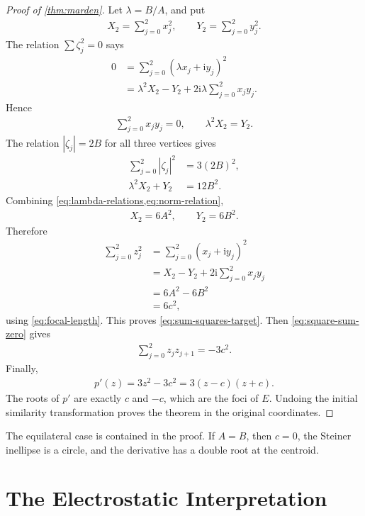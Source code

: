 \documentclass[11pt]{article}
\newcommand{\ii}{\mathrm{i}}
\begin{document}
\begin{proof}[Proof of \cref{thm:marden}]
Let \(\lambda=B/A\), and put
\begin{align}
  X_2=\sum_{j=0}^{2}x_j^2,\qquad
  Y_2=\sum_{j=0}^{2}y_j^2.
\end{align}
The relation \(\sum \zeta_j^2=0\) says
\begin{align}
  0
    &=\sum_{j=0}^{2}\left(\lambda x_j+\ii y_j\right)^2\\
    &=\lambda^2X_2-Y_2
      +2\ii\lambda\sum_{j=0}^{2}x_jy_j.
\end{align}
Hence
\begin{align}
  \sum_{j=0}^{2}x_jy_j=0,
  \qquad
  \lambda^2X_2=Y_2.
  \label{eq:lambda-relations}
\end{align}
The relation \(|\zeta_j|=2B\) for all three vertices gives
\begin{align}
  \sum_{j=0}^{2}|\zeta_j|^2
    &=3(2B)^2,\\
  \lambda^2X_2+Y_2
    &=12B^2.
  \label{eq:norm-relation}
\end{align}
Combining \cref{eq:lambda-relations,eq:norm-relation},
\begin{align}
  X_2=6A^2,
  \qquad
  Y_2=6B^2.
\end{align}
Therefore
\begin{align}
  \sum_{j=0}^{2}z_j^2
    &=\sum_{j=0}^{2}(x_j+\ii y_j)^2\\
    &=X_2-Y_2+2\ii\sum_{j=0}^{2}x_jy_j\\
    &=6A^2-6B^2\\
    &=6c^2,
\end{align}
using \cref{eq:focal-length}. This proves \cref{eq:sum-squares-target}. Then \cref{eq:square-sum-zero} gives
\begin{align}
  \sum_{j=0}^{2}z_jz_{j+1}=-3c^2.
\end{align}
Finally,
\begin{align}
  p'(z)=3z^2-3c^2=3(z-c)(z+c).
\end{align}
The roots of \(p'\) are exactly \(c\) and \(-c\), which are the foci of \(E\). Undoing the initial similarity transformation proves the theorem in the original coordinates.
\end{proof}

\begin{checkpointbox}
The equilateral case is contained in the proof. If \(A=B\), then \(c=0\), the Steiner inellipse is a circle, and the derivative has a double root at the centroid.
\end{checkpointbox}

\section{The Electrostatic Interpretation}
\end{document}
